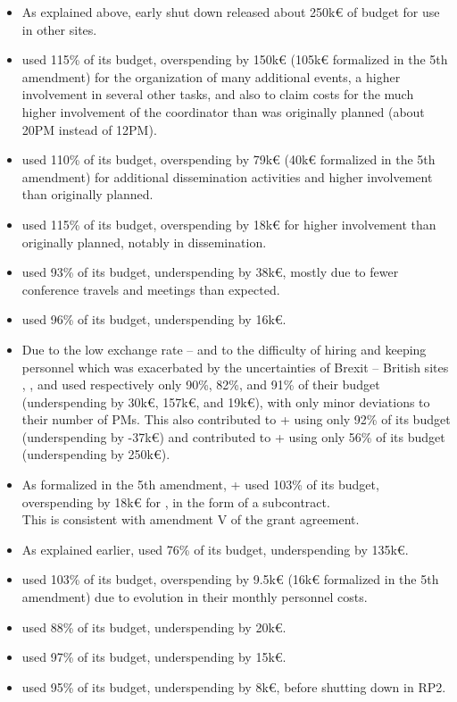 \begin{itemize}
\item As explained above,  early shut down released about
  250k€ of budget for use in other sites.
\item {} used 115\% of its budget, overspending by 150k€ (105k€
  formalized in the 5th amendment) for the organization of many
  additional events, a higher involvement in several other tasks, and
  also to claim costs for the much higher involvement of the
  coordinator than was originally planned (about 20PM instead of
  12PM).
\item {} used 110\% of its budget, overspending by 79k€ (40k€
  formalized in the 5th amendment) for additional dissemination
  activities and higher involvement than originally planned.
\item {} used 115\% of its budget, overspending by 18k€ for
  higher involvement than originally planned, notably in
  dissemination.
\item {} used 93\% of its budget, underspending by 38k€, mostly due to fewer conference travels and meetings than expected.
\item {} used 96\% of its budget, underspending by 16k€.
\item Due to the low exchange rate -- and to the difficulty of hiring
  and keeping personnel which was exacerbated by the uncertainties of
  Brexit -- British sites , , and  used
  respectively only 90\%, 82\%, and 91\% of their budget
  (underspending by 30k€, 157k€, and 19k€), with only minor deviations
  to their number of PMs. This also contributed to
  + using only 92\% of its budget (underspending
  by -37k€) and contributed to + using only 56\%
  of its budget (underspending by 250k€).
\item As formalized in the 5th amendment, + used
  103\% of its budget, overspending by 18k€ for
  , in the form of a subcontract.\\
  This is consistent with amendment V of the grant agreement.
\item As explained earlier,  used 76\% of its budget,
  underspending by 135k€.
\item {} used 103\% of its budget, overspending by 9.5k€ (16k€
  formalized in the 5th amendment) due to evolution in their monthly
  personnel costs.
\item {} used 88\% of its budget, underspending by 20k€.
\item {} used 97\% of its budget, underspending by 15k€.
\item {} used 95\% of its budget, underspending by 8k€, before
  shutting down in RP2.
\end{itemize}



